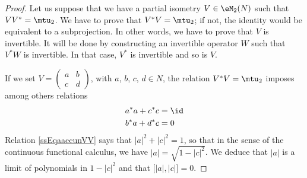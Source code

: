 \begin{proof}
Let us suppose that we have a partial isometry $V\in\eM_2(N)$ such that $VV^*=\mtu_2$. We have to prove that $V^*V=\mtu_2$; if not, the identity would be equivalent to a subprojection. In other words, we have to prove that $V$ is invertible. It will be done by constructing an invertible operator $W$ such that $V^*W$ is invertible. In that case, $V^*$ is invertible and so is $V$.

If we set $V=
\begin{pmatrix}
a&b\\
c&d
\end{pmatrix}$, with $a$, $b$, $c$, $d\in N$, the relation $V^*V=\mtu_2$ imposes among others relations
\begin{subequations}	\label{SubEassEqaaccunVV}
\begin{align}
a^*a+c^*c&=\id		\label{ssEqaaccunVV}\\
b^*a+d^*c&=0		\label{ssEqbadczVV}
\end{align}
\end{subequations}
Relation \eqref{ssEqaaccunVV} says that $| a |^2+| c |^2=1$, so that in the sense of the continuous functional calculus, we have $| a |=\sqrt{1-| c |^2}$. We deduce that $| a |$ is a limit of polynomials in $1-| c |^2$ and that $\big[ | a |,| c | \big]=0$.


\end{proof}
